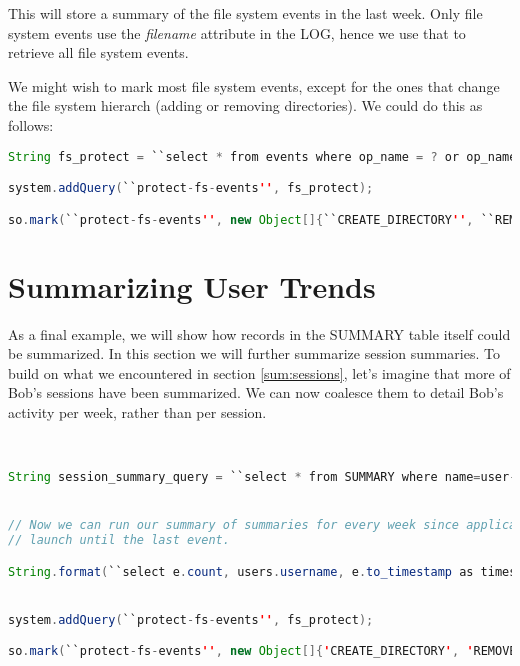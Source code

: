 \noindent
This will store a summary of the file system events in the last week. Only file system events use the \emph{filename} attribute in the LOG, hence we use that to retrieve all file system events.

We might wish to mark most file system events, except for the ones that change the file system hierarch (adding or removing directories). We could do this as follows:

\begin{lstlisting}[language=Java]
String fs_protect = ``select * from events where op_name = ? or op_name = ?''

system.addQuery(``protect-fs-events'', fs_protect);

so.mark(``protect-fs-events'', new Object[]{``CREATE_DIRECTORY'', ``REMOVE_DIRECTORY''});
\end{lstlisting}

\section{Summarizing User Trends}

As a final example, we will show how records in the SUMMARY table itself could be summarized. In this section we will further summarize session summaries. To build on what we encountered in section \ref{sum:sessions}, let's imagine that more of Bob's sessions have been summarized. We can now coalesce them to detail Bob's activity per week, rather than per session.

\begin{lstlisting}[language=Java]


String session_summary_query = ``select * from SUMMARY where name=user-session-summary and args[0]=? args[3] < ?';


// Now we can run our summary of summaries for every week since application
// launch until the last event.

String.format(``select e.count, users.username, e.to_timestamp as timestamp from (select count(*), tags_modified, (to_timestamp(((extract (epoch from events.timestamp)/\%d)::int)*\%d)) from events where running_principal<>4 and tags_modified in (select tag from users) group by (to_timestamp(((extract (epoch from events.timestamp)/\%d)::int)*\%d)), tags_modified) as e inner join users on e.tags_modified=users.tag'', bucket_size, bucket_size, bucket_size, bucket_size)


system.addQuery(``protect-fs-events'', fs_protect);

so.mark(``protect-fs-events'', new Object[]{'CREATE_DIRECTORY', 'REMOVE_DIRECTORY'});
\end{lstlisting}


